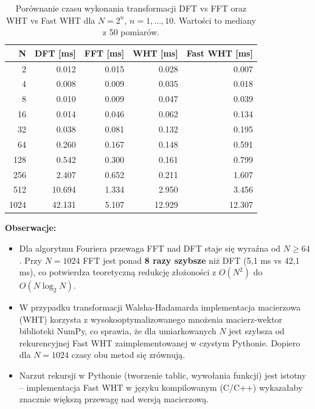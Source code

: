 \documentclass[12pt]{article}
\begin{document}
\begin{table}[H]
    \centering
    \vspace{0.2cm}
    \begin{tabular}{|r|r|r|r|r|}
        \hline
        \textbf{N} & \textbf{DFT [ms]} & \textbf{FFT [ms]} & \textbf{WHT [ms]} & \textbf{Fast WHT [ms]} \\ \hline
        2     & 0.012  & 0.015  & 0.028  & 0.007  \\ \hline
        4     & 0.008  & 0.009  & 0.035  & 0.018  \\ \hline
        8     & 0.010  & 0.009  & 0.047  & 0.039  \\ \hline
        16    & 0.014  & 0.046  & 0.062  & 0.134  \\ \hline
        32    & 0.038  & 0.081  & 0.132  & 0.195  \\ \hline
        64    & 0.260  & 0.167  & 0.148  & 0.591  \\ \hline
        128   & 0.542  & 0.300  & 0.161  & 0.799  \\ \hline
        256   & 2.407  & 0.652  & 0.211  & 1.607  \\ \hline
        512   & 10.694 & 1.334  & 2.950  & 3.456  \\ \hline
        1024  & 42.131 & 5.107  & 12.929 & 12.307 \\ \hline
    \end{tabular}
    \caption{Porównanie czasu wykonania transformacji DFT vs FFT oraz WHT vs Fast WHT dla $N = 2^n$, $n = 1, \ldots, 10$. Wartości to mediany z 50 pomiarów.}
    \label{tab:czasy}
\end{table}

\textbf{Obserwacje:}
\begin{itemize}
    \item Dla algorytmu Fouriera przewaga FFT nad DFT staje się wyraźna od $N \geq 64$. Przy $N = 1024$ FFT jest ponad \textbf{8 razy szybsze} niż DFT (5,1 ms vs 42,1 ms), co potwierdza teoretyczną redukcję złożoności z $O(N^2)$ do $O(N \log_2 N)$.
    \item W przypadku transformacji Walsha-Hadamarda implementacja macierzowa (WHT) korzysta z wysokooptymalizowanego mnożenia macierz-wektor biblioteki NumPy, co sprawia, że dla umiarkowanych $N$ jest szybsza od rekurencyjnej Fast WHT zaimplementowanej w czystym Pythonie. Dopiero dla $N = 1024$ czasy obu metod się zrównują.
    \item Narzut rekursji w Pythonie (tworzenie tablic, wywołania funkcji) jest istotny -- implementacja Fast WHT w języku kompilowanym (C/C++) wykazałaby znacznie większą przewagę nad wersją macierzową.
\end{itemize}
\end{document}
